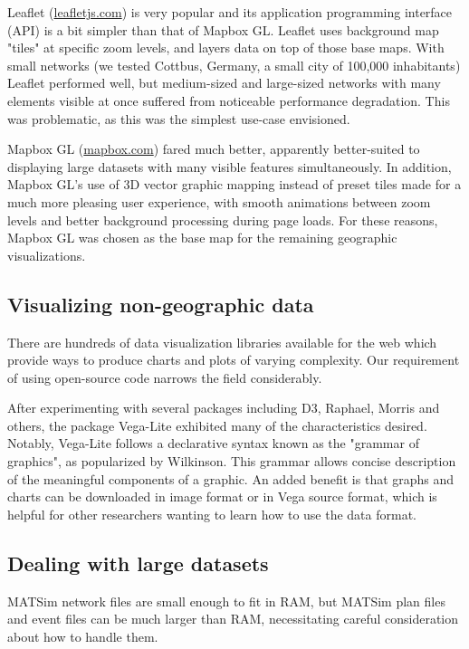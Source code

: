 \documentclass[Afour,sagev,times]{sagej}
\begin{document}
Leaflet (\url{leafletjs.com}) is very popular and its application programming interface (API) is a bit simpler than that of Mapbox GL. Leaflet uses background map "tiles" at specific zoom levels, and layers data on top of those base maps. With small networks (we tested Cottbus, Germany, a small city of 100,000 inhabitants) Leaflet performed well, but medium-sized and large-sized networks with many elements visible at once suffered from noticeable performance degradation. This was problematic, as this was the simplest use-case envisioned.

Mapbox GL (\url{mapbox.com}) fared much better, apparently better-suited to displaying large datasets with many visible features simultaneously. In addition, Mapbox GL's use of 3D vector graphic mapping instead of preset tiles made for a much more pleasing user experience, with smooth animations between zoom levels and better background processing during page loads. For these reasons, Mapbox GL was chosen as the base map for the remaining geographic visualizations.

\subsection{Visualizing non-geographic data}

There are hundreds of data visualization libraries available for the web which provide ways to produce charts and plots of varying complexity. Our requirement of using open-source code narrows the field considerably.

After experimenting with several packages including D3, Raphael, Morris and others, the package Vega-Lite\cite{R5} exhibited many of the characteristics desired. Notably, Vega-Lite follows a declarative syntax known as the "grammar of graphics", as popularized by Wilkinson\cite{R6}. This grammar allows concise description of the meaningful components of a graphic. An added benefit is that graphs and charts can be downloaded in image format or in Vega source format, which is helpful for other researchers wanting to learn how to use the data format.

\subsection{Dealing with large datasets}

MATSim network files are small enough to fit in RAM, but MATSim plan files and event files can be much larger than RAM, necessitating careful consideration about how to handle them.
\end{document}
